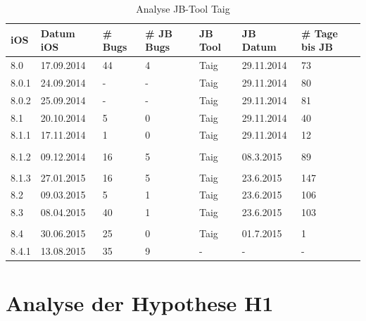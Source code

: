 \begin{table}[htp!]
    \begin{center}
        \begin{tabular}{| p{10mm} | p{18mm} | p{17mm} | p{25mm} | p{18mm} | p{22mm} | p{15mm} |} \hline
            \textbf{iOS} & \textbf{Datum iOS} & \textbf{\# Bugs} & \textbf{\# JB Bugs} & \textbf{JB Tool} & \textbf{JB Datum} & \textbf{\# Tage bis JB} \\ \hline 
8.0 & 17.09.2014 & 44 & 4 & Taig & 29.11.2014 & 73  \\ \hline
8.0.1 & 24.09.2014	& - & - & Taig & 29.11.2014 & 80  \\ \hline
8.0.2 & 25.09.2014 & - & -  & Taig & 29.11.2014 & 81  \\ \hline
8.1 & 20.10.2014 & 5 & 0 & Taig & 29.11.2014 & 40  \\ \hline
8.1.1 & 17.11.2014 & 1 & 0 & Taig & 29.11.2014 & 12  \\ \hline
 & & & & & & \\ \hline						
8.1.2 & 09.12.2014 & 16 & 5 & Taig & 08.3.2015 & 89  \\ \hline
	 & & & & & & \\ \hline						
8.1.3 & 27.01.2015 & 16 & 5 & Taig & 23.6.2015 & 147  \\ \hline
8.2  & 09.03.2015 & 5 & 1 & Taig & 23.6.2015 & 106  \\ \hline
8.3 &  08.04.2015 & 40 &1 & Taig & 23.6.2015 & 103  \\ \hline
		 & & & & & & \\ \hline					
8.4 &  30.06.2015 & 25 & 0 & Taig & 01.7.2015 & 1  \\ \hline
8.4.1 & 13.08.2015 & 35 & 9 & - & - & -   \\ \hline
        \end{tabular} 
        \caption{Analyse JB-Tool Taig}
        \label{tab:AnalyseTaig}
    \end{center}
\end{table}



 
 
 



 





\newpage
\section{Analyse der Hypothese H1}
\label{sec:AnalyseHypo}




 